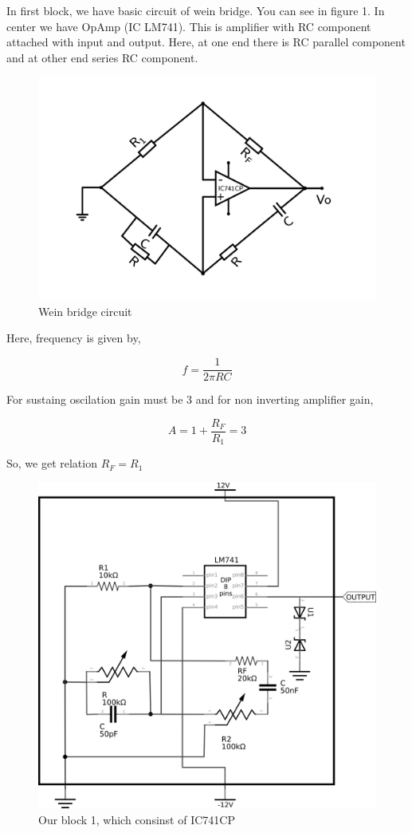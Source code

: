 \documentclass{article}
\begin{document}
In first block, we have basic circuit of wein bridge. You can see in figure 1. In center we have OpAmp (IC LM741). This is amplifier with RC component attached with input and output. Here, at one end there is RC parallel component and at other end series RC component. 

\begin{figure}[htbp]
\centering
\includegraphics[width=.8\textwidth]{imgs/sine.png}
\caption{\label{fig:org68e4d67}Wein bridge circuit}
\end{figure}

Here, frequency is given by, 

\begin{equation}
\label{eq:org74cf283}
  f =\frac{1}{2 \pi RC}
\end{equation}

For sustaing oscilation gain must be 3 and for non inverting amplifier gain, 

\begin{equation}
\label{eq:org90b23f8}
  A = 1+\frac{R_{F}}{R_{1}} = 3
\end{equation}

So, we get relation \(R_{F}=R_{1}\)


\begin{figure}[htbp]
\centering
\includegraphics[width=0.8 \textwidth]{imgs/sinereal.png}
\caption{\label{fig:org4da73b4}Our block 1, which consinst of IC741CP}
\end{figure}
\end{document}
